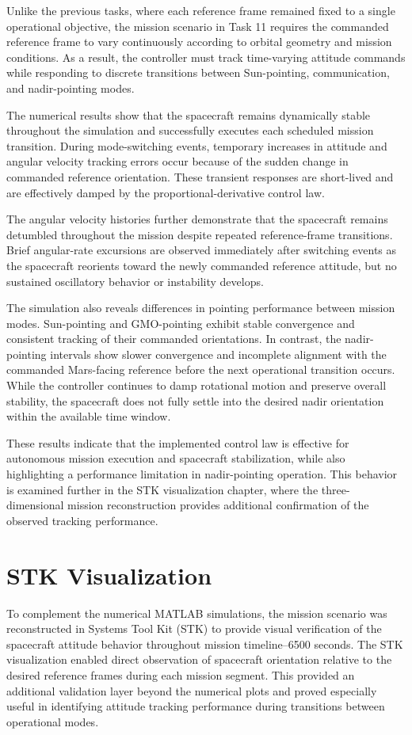 \documentclass[12pt,a4paper]{report}
\begin{document}
	Unlike the previous tasks, where each reference frame remained fixed to a single operational objective, the mission scenario in Task 11 requires the commanded reference frame to vary continuously according to orbital geometry and mission conditions. As a result, the controller must track time-varying attitude commands while responding to discrete transitions between Sun-pointing, communication, and nadir-pointing modes.
	
	The numerical results show that the spacecraft remains dynamically stable throughout the simulation and successfully executes each scheduled mission transition. During mode-switching events, temporary increases in attitude and angular velocity tracking errors occur because of the sudden change in commanded reference orientation. These transient responses are short-lived and are effectively damped by the proportional-derivative control law.
	
	The angular velocity histories further demonstrate that the spacecraft remains detumbled throughout the mission despite repeated reference-frame transitions. Brief angular-rate excursions are observed immediately after switching events as the spacecraft reorients toward the newly commanded reference attitude, but no sustained oscillatory behavior or instability develops.
	
	The simulation also reveals differences in pointing performance between mission modes. Sun-pointing and GMO-pointing exhibit stable convergence and consistent tracking of their commanded orientations. In contrast, the nadir-pointing intervals show slower convergence and incomplete alignment with the commanded Mars-facing reference before the next operational transition occurs. While the controller continues to damp rotational motion and preserve overall stability, the spacecraft does not fully settle into the desired nadir orientation within the available time window.
	
	These results indicate that the implemented control law is effective for autonomous mission execution and spacecraft stabilization, while also highlighting a performance limitation in nadir-pointing operation. This behavior is examined further in the STK visualization chapter, where the three-dimensional mission reconstruction provides additional confirmation of the observed tracking performance.
	
	
	\chapter{STK Visualization}
	To complement the numerical MATLAB simulations, the mission scenario was reconstructed in Systems Tool Kit (STK) to provide visual verification of the spacecraft attitude behavior throughout mission timeline--6500 seconds. The STK visualization enabled direct observation of spacecraft orientation relative to the desired reference frames during each mission segment. This provided an additional validation layer beyond the numerical plots and proved especially useful in identifying attitude tracking performance during transitions between operational modes.
\end{document}
